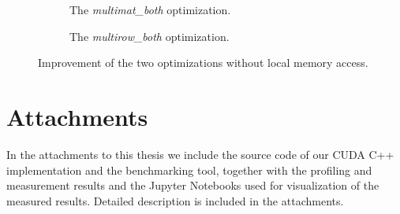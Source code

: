\begin{figure}[ht]
	\centering	
	\begin{subfigure}{0.45\textwidth}
		\centering
		\def\svgwidth{\textwidth}
		
		\caption{The \textit{multimat\_both} optimization.}
		\label{fig:multimat_both_speedup}
	\end{subfigure}
	\hfill
	\begin{subfigure}{0.45\textwidth}
		\centering
		\def\svgwidth{\textwidth}
		
		\caption{The \textit{multirow\_both} optimization.}
		\label{fig:multirow_both_speedup}
	\end{subfigure}
	
	\caption{Improvement of the two optimizations without local memory access.}
	\label{fig:speedup_local_mem}
\end{figure}




\chapter{Attachments}

In the attachments to this thesis we include the source code of our CUDA C++ implementation and the benchmarking tool, together with the profiling and measurement results and the Jupyter Notebooks used for visualization of the measured results. Detailed description is included in the attachments.